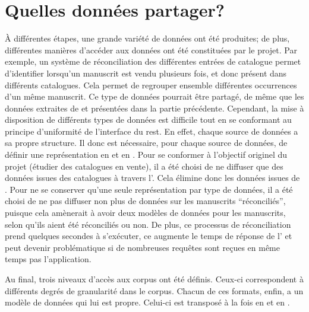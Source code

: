 \section{Quelles données partager?}
À différentes étapes, une grande variété de données ont été produites; de plus, différentes manières d'accéder aux données ont été constituées par le projet. Par exemple, un système de réconciliation des différentes entrées de catalogue permet d'identifier lorsqu'un manuscrit est vendu plusieurs fois, et donc présent dans différents catalogues. Cela permet de regrouper ensemble différentes occurrences d'un même manuscrit. Ce type de données pourrait être partagé, de même que les données extraites de \sparql{} et présentées dans la partie précédente. Cependant, la mise à disposition de différents types de données est difficile tout en se conformant au principe d'uniformité de l'interface du \gls{rest}. En effet, chaque source de données a sa propre structure. Il donc est nécessaire, pour chaque source de données, de définir une représentation en \json{} et en \tei{}. Pour se conformer à l'objectif originel du projet \mssktb{} (étudier des catalogues en vente), il a été choisi de ne diffuser que des données issues des catalogues à travers l'\api{}. Cela élimine donc les données issues de \sparql{}. Pour ne se conserver qu'une seule représentation par type de données, il a été choisi de ne pas diffuser non plus de données sur les manuscrits \enquote{réconciliés}, puisque cela amènerait à avoir deux modèles de données pour les manuscrits, selon qu'ils aient été réconciliés ou non. De plus, ce processus de réconciliation prend quelques secondes à s'exécuter, ce augmente le temps de réponse de l'\api{} et peut devenir problématique si de nombreuses requêtes sont reçues en même temps pas l'application.

Au final, trois niveaux d'accès aux corpus ont été définis. Ceux-ci correspondent à différents degrés de granularité dans le corpus. Chacun de ces formats, enfin, a un modèle de données qui lui est propre. Celui-ci est transposé à la fois en \xmltei{} et en \json{}. 

